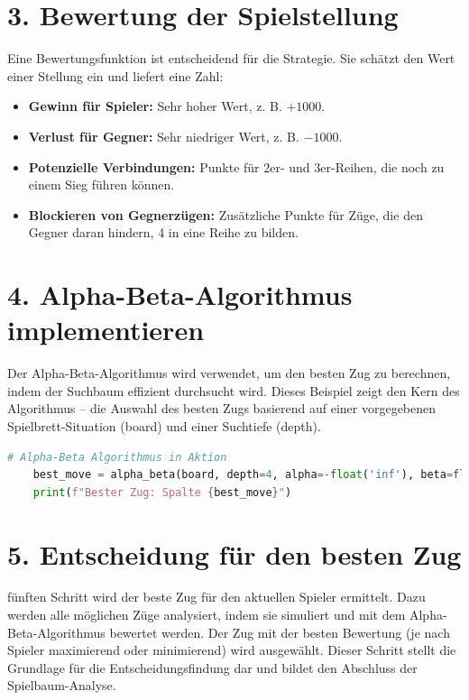 \section*{3. Bewertung der Spielstellung}

Eine Bewertungsfunktion ist entscheidend für die Strategie. Sie schätzt den Wert einer Stellung ein und liefert eine Zahl:

\begin{itemize}
	\item \textbf{Gewinn für Spieler:} Sehr hoher Wert, z. B. \( +1000 \).
	\item \textbf{Verlust für Gegner:} Sehr niedriger Wert, z. B. \( -1000 \).
	\item \textbf{Potenzielle Verbindungen:} Punkte für 2er- und 3er-Reihen, die noch zu einem Sieg führen können.
	\item \textbf{Blockieren von Gegnerzügen:} Zusätzliche Punkte für Züge, die den Gegner daran hindern, 4 in eine Reihe zu bilden.
\end{itemize}

\section*{4. Alpha-Beta-Algorithmus implementieren}
	Der Alpha-Beta-Algorithmus wird verwendet, um den besten Zug zu berechnen, indem der Suchbaum effizient durchsucht wird. 
	Dieses Beispiel zeigt den Kern des Algorithmus – die Auswahl des besten Zugs basierend auf einer vorgegebenen Spielbrett-Situation (board) und einer Suchtiefe (depth). 
\begin{lstlisting}[language=Python, caption=Alpha-Beta Algorithmus - Kurzer Überblick]
	# Alpha-Beta Algorithmus in Aktion
	best_move = alpha_beta(board, depth=4, alpha=-float('inf'), beta=float('inf'), maximizingPlayer=True)
	print(f"Bester Zug: Spalte {best_move}")
\end{lstlisting}

\section*{5. Entscheidung für den besten Zug}

 fünften Schritt wird der beste Zug für den aktuellen Spieler ermittelt. Dazu werden alle möglichen Züge analysiert, indem sie simuliert und mit dem Alpha-Beta-Algorithmus bewertet werden. Der Zug mit der besten Bewertung (je nach Spieler maximierend oder minimierend) wird ausgewählt. Dieser Schritt stellt die Grundlage für die Entscheidungsfindung dar und bildet den Abschluss der Spielbaum-Analyse.

